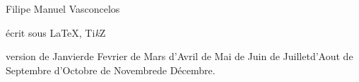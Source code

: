 \vspace*{1cm}
\mbox{}\hfill{}

{\vspace*{3cm}\centerline{\Huge Filipe Manuel Vasconcelos}}

{\small\hbox{}\vfill
\hfill écrit sous \LaTeX, Ti\emph{k}Z

\renewcommand{\today}{\ifcase\month\or de Janvier\or de Fevrier \or de Mars
                                   \or d'Avril   \or de Mai     \or de Juin
                                   \or de Juillet\or d'Aout     \or de Septembre
                                   \or d'Octobre \or de Novembre\or de Décembre\fi\number \year}
\hfill version \today.

\hfill 
\doclicenseLongText

\hfill 
\doclicenseImage[imagewidth=10em]
}
